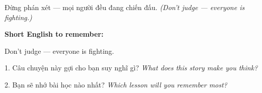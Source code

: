 \begin{baihoc}
Đừng phán xét — mọi người đều đang chiến đấu.
\textit{(Don't judge — everyone is fighting.)}
\end{baihoc}

\begin{ghinhoanh}
\textbf{Short English to remember:}

Don't judge — everyone is fighting.

\end{ghinhoanh}

\begin{tuhocnhanh}
1. Câu chuyện này gợi cho bạn suy nghĩ gì? \textit{What does this story make you think?}

2. Bạn sẽ nhớ bài học nào nhất? \textit{Which lesson will you remember most?}
\end{tuhocnhanh}
\ngancach

